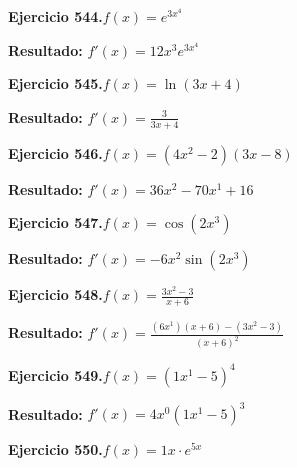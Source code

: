 \documentclass[10pt,a4paper]{article}
\begin{document}
\newpage
\begin{ejbox}
\textbf{Ejercicio 544.}\quad $f(x) = e^{3x^{4}}$
\end{ejbox}

\begin{solbox}
\textbf{Resultado:} \(\displaystyle f'(x) = 12x^{3}e^{3x^{4}}\)
\end{solbox}

\begin{ejbox}
\textbf{Ejercicio 545.}\quad $f(x) = \ln(3x + 4)$
\end{ejbox}

\begin{solbox}
\textbf{Resultado:} \(\displaystyle f'(x) = \frac{3}{3x + 4}\)
\end{solbox}

\begin{ejbox}
\textbf{Ejercicio 546.}\quad $f(x) = (4x^{2} -2)(3x -8)$
\end{ejbox}

\begin{solbox}
\textbf{Resultado:} \(\displaystyle f'(x) = 36x^{2} -70x^{1} +16\)
\end{solbox}

\newpage
\begin{ejbox}
\textbf{Ejercicio 547.}\quad $f(x) = \cos(2x^{3})$
\end{ejbox}

\begin{solbox}
\textbf{Resultado:} \(\displaystyle f'(x) = -6x^{2}\sin(2x^{3})\)
\end{solbox}

\begin{ejbox}
\textbf{Ejercicio 548.}\quad $f(x) = \frac{3x^{2} -3}{x + 6}$
\end{ejbox}

\begin{solbox}
\textbf{Resultado:} \(\displaystyle f'(x) = \frac{(6x^{1})(x+6) - (3x^{2} -3)}{(x+6)^2}\)
\end{solbox}

\begin{ejbox}
\textbf{Ejercicio 549.}\quad $f(x) = (1x^{1} -5)^{4}$
\end{ejbox}

\begin{solbox}
\textbf{Resultado:} \(\displaystyle f'(x) = 4x^{0}(1x^{1} -5)^{3}\)
\end{solbox}

\newpage
\begin{ejbox}
\textbf{Ejercicio 550.}\quad $f(x) = 1x \cdot e^{5x}$
\end{ejbox}
\end{document}
